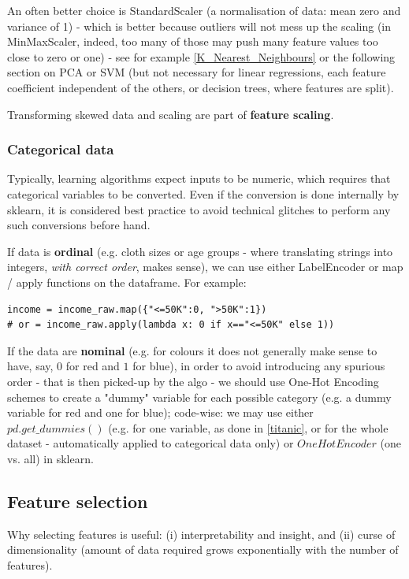 \documentclass[11pt]{article}
\begin{document}
An often better choice is StandardScaler (a normalisation of data: mean zero and variance of 1) - which is better because outliers will not mess up the scaling (in MinMaxScaler, indeed, too many of those may push many feature values too close to zero or one) - see for example \ref{K_Nearest_Neighbours} or the following section on PCA or SVM (but not necessary for linear regressions, each feature coefficient independent of the others, or decision trees, where features are split). 

Transforming skewed data and scaling are part of \textbf{feature scaling}.

\subsubsection*{Categorical data}
Typically, learning algorithms expect inputs to be numeric, which requires that categorical variables to be converted. Even if the conversion is done internally by sklearn, it is considered best practice to avoid technical glitches to perform any such conversions before hand.

If data is \textbf{ordinal} (e.g. cloth sizes or age groups - where translating strings into integers, \textit{with correct order}, makes sense), we can use either LabelEncoder  or map / apply functions on the dataframe. For example:
\begin{lstlisting}
income = income_raw.map({"<=50K":0, ">50K":1}) 
# or = income_raw.apply(lambda x: 0 if x=="<=50K" else 1))
\end{lstlisting}

If the data are \textbf{nominal} (e.g. for colours it does not generally make sense to have, say, $0$ for red and $1$ for blue), in order to avoid introducing any spurious order - that is then picked-up by the algo - we should use One-Hot Encoding schemes to create a "dummy" variable for each possible category (e.g. a dummy variable for red and one for blue); code-wise: we may use either $pd.get\_dummies()$ (e.g. for one variable, as done in \ref{titanic}, or for the whole dataset - automatically applied to categorical data only) or $OneHotEncoder$ (one vs. all) in sklearn.

\subsection{Feature selection}
Why selecting features is useful: (i) interpretability and insight, and (ii) curse of dimensionality (amount of data required grows exponentially with the number of features).
\end{document}
